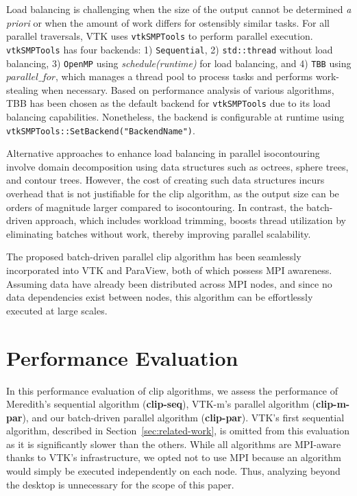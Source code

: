 \documentclass{egpubl}
\begin{document}
Load balancing is challenging when the size of the output cannot be determined \textit{a priori} or when the amount of work differs for ostensibly similar tasks. For all parallel traversals, VTK uses \texttt{vtkSMPTools} to perform parallel execution. \texttt{vtkSMPTools} has four backends: 1) \texttt{Sequential}, 2) \texttt{std::thread} without load balancing, 3) \texttt{OpenMP} using \textit{schedule(runtime)} for load balancing, and 4) \texttt{TBB} \cite{TBB} using $parallel\_for$, which manages a thread pool to process tasks and performs work-stealing when necessary. Based on performance analysis of various algorithms, TBB has been chosen as the default backend for \texttt{vtkSMPTools} due to its load balancing capabilities. Nonetheless, the backend is configurable at runtime using \texttt{vtkSMPTools::SetBackend("BackendName")}.

Alternative approaches to enhance load balancing in parallel isocontouring involve domain decomposition using data structures such as octrees, sphere trees, and contour trees. However, the cost of creating such data structures incurs overhead that is not justifiable for the clip algorithm, as the output size can be orders of magnitude larger compared to isocontouring. In contrast, the batch-driven approach, which includes workload trimming, boosts thread utilization by eliminating batches without work, thereby improving parallel scalability.

The proposed batch-driven parallel clip algorithm has been seamlessly incorporated into VTK and ParaView, both of which possess MPI awareness. Assuming data have already been distributed across MPI nodes, and since no data dependencies exist between nodes, this algorithm can be effortlessly executed at large scales. 

\section{Performance Evaluation}
\label{sec:perf-eval}

In this performance evaluation of clip algorithms, we assess the performance of Meredith's sequential algorithm (\textbf{clip-seq}), VTK-m's parallel algorithm (\textbf{clip-m-par}), and our batch-driven parallel algorithm (\textbf{clip-par}). VTK's first sequential algorithm, described in Section~\ref{sec:related-work}, is omitted from this evaluation as it is significantly slower than the others. While all algorithms are MPI-aware thanks to VTK's infrastructure, we opted not to use MPI because an algorithm would simply be executed independently on each node. Thus, analyzing beyond the desktop is unnecessary for the scope of this paper.
\end{document}
